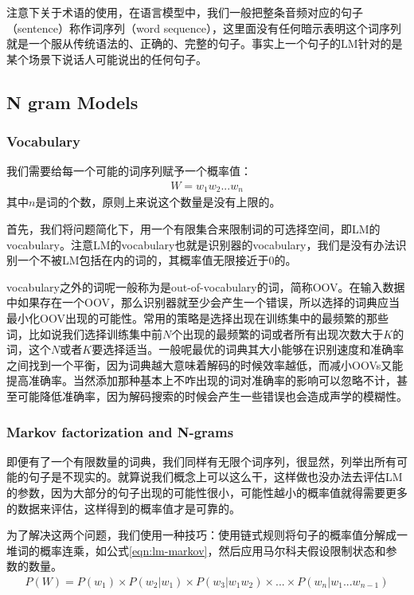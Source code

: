 注意下关于术语的使用，在语言模型中，我们一般把整条音频对应的句子（sentence）称作词序列（word sequence），这里面没有任何暗示表明这个词序列就是一个服从传统语法的、正确的、完整的句子。事实上一个句子的LM针对的是某个场景下说话人可能说出的任何句子。
\subsection{N gram Models}
\subsubsection{Vocabulary}
我们需要给每一个可能的词序列赋予一个概率值：
\begin{align}
  W=w_{1}w_{2}...w_{n}
\end{align}
其中$n$是词的个数，原则上来说这个数量是没有上限的。

首先，我们将问题简化下，用一个有限集合来限制词的可选择空间，即LM的vocabulary。注意LM的vocabulary也就是识别器的vocabulary，我们是没有办法识别一个不被LM包括在内的词的，其概率值无限接近于0的。

vocabulary之外的词呢一般称为是out-of-vocabulary的词，简称OOV。在输入数据中如果存在一个OOV，那么识别器就至少会产生一个错误，所以选择的词典应当最小化OOV出现的可能性。常用的策略是选择出现在训练集中的最频繁的那些词，比如说我们选择训练集中前$N$个出现的最频繁的词或者所有出现次数大于$K$的词，这个$N$或者$K$要选择适当。一般呢最优的词典其大小能够在识别速度和准确率之间找到一个平衡，因为词典越大意味着解码的时候效率越低，而减小OOVs又能提高准确率。当然添加那种基本上不咋出现的词对准确率的影响可以忽略不计，甚至可能降低准确率，因为解码搜索的时候会产生一些错误也会造成声学的模糊性。

\subsubsection{Markov factorization and N-grams}
即便有了一个有限数量的词典，我们同样有无限个词序列，很显然，列举出所有可能的句子是不现实的。就算说我们概念上可以这么干，这样做也没办法去评估LM的参数，因为大部分的句子出现的可能性很小，可能性越小的概率值就得需要更多的数据来评估，这样得到的概率值才是可靠的。

为了解决这两个问题，我们使用一种技巧：使用链式规则将句子的概率值分解成一堆词的概率连乘，如公式\ref{eqn:lm-markov}，然后应用马尔科夫假设限制状态和参数的数量。
\begin{align}
\label{eqn:lm-markov}
P(W) = P(w_1)\times{P(w_2|w_1)}\times{P(w_3|w_{1}w_{2})}\times...\times{P(w_n|w_{1}...w_{n-1})} 
\end{align}

